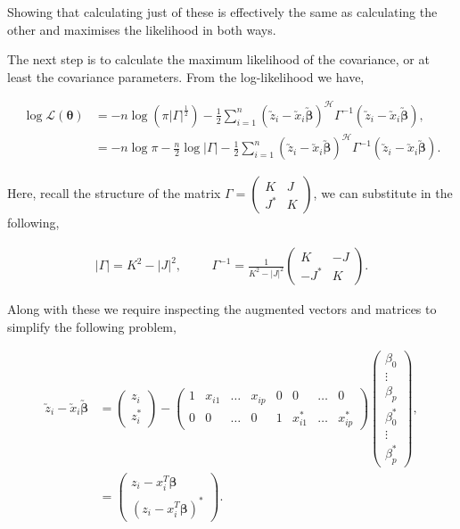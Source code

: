 \documentclass[honours,12pt]{unswthesis}
\newcommand{\ta}{\bm{\theta}}
\newcommand{\augb}{\bm{\utilde{\beta}}}
\newcommand{\ct}{\mathcal{H}}
\numberwithin{equation}{section}
\begin{document}
\noindent Showing that calculating just of these is effectively the same as calculating the other and maximises the likelihood in both ways. \par

The next step is to calculate the maximum likelihood of the covariance, or at least the covariance parameters. From the  log-likelihood we have,

\begin{align*}
    \log{ \mathcal{L} \left( \ta \right)} &= - n \log{ \left( \pi | \Gamma |^{\frac{1}{2}} \right)} - \frac{1}{2} \sum_{i=1}^{n} \left( \utilde{z}_{i} - \utilde{x}_{i} \augb \right)^{\ct} \Gamma^{-1} \left( \utilde{z}_{i} - \utilde{x}_{i} \augb \right), \\
    &= - n \log{ \pi } - \frac{n}{2} \log { | \Gamma | }  - \frac{1}{2} \sum_{i=1}^{n} \left( \utilde{z}_{i} - \utilde{x}_{i} \augb \right)^{\ct} \Gamma^{-1} \left( \utilde{z}_{i} - \utilde{x}_{i} \augb \right).
\end{align*}

\noindent Here, recall the structure of the matrix $\Gamma = \begin{pmatrix} K & J \\ J^{*} & K \end{pmatrix}$, we can substitute in the following,

\begin{align*}
    | \Gamma | = K^{2} - |J|^{2}, \hspace{1cm} \Gamma^{-1} = \frac{1}{K^{2} - |J|^{2}} \begin{pmatrix}
        K & -J \\
        -J^{*} & K
    \end{pmatrix}.
\end{align*}

\noindent Along with these we require inspecting the augmented vectors and matrices to simplify the following problem,

\begin{align*}
    \utilde{z}_{i} - \utilde{x}_{i} \augb &= \begin{pmatrix}
        z_{i} \\ z_{i}^{*}
    \end{pmatrix} - \begin{pmatrix}
        1 & x_{i1} & \hdots & x_{ip} & 0 & 0 & \hdots & 0 \\
        0 & 0 & \hdots & 0 & 1 & x_{i1}^{*} & \hdots & x_{ip}^{*}
    \end{pmatrix} 
    \begin{pmatrix}
        \beta_{0} \\ \vdots \\\beta_{p} \\ \beta_{0}^{*} \\ \vdots \\ \beta_{p}^{*}
    \end{pmatrix},\\
    &= \begin{pmatrix}
        z_{i} - x_{i}^{T} \bm{\beta} \\
        \left( z_{i} - x_{i}^{T} \bm{\beta} \right)^{*}
    \end{pmatrix}.
\end{align*}
\end{document}
